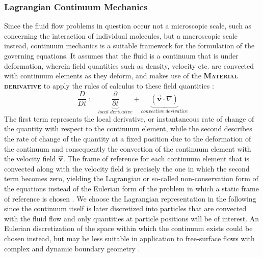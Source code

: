 \documentclass[oneside, a4paper]{book}
\newcommand\emphasis[1]{{\scshape\bfseries#1}}
\newcommand\vek[1]{\vec{\bm{#1}}}
\newcommand\br[1]{\left(#1\right)}
\begin{document}
    \subsubsection{Lagrangian Continuum Mechanics}
    Since the fluid flow problems in question occur not a microscopic scale, such as concerning the interaction of individual molecules, but a macroscopic scale instead, continuum mechanics is a suitable framework for the formulation of the governing equations. It assumes that the fluid is a continuum that is under deformation, wherein field quantities such as density, velocity etc. are convected with continuum elements as they deform, and makes use of the \emphasis{Material derivative} to apply the rules of calculus to these field quantities \autocite{anderson}:
      \begin{equation}
        \frac{D}{Dt} := \underbrace{\frac{\partial}{\partial t}}_{\textit{local derivative}} + \underbrace{\br{\vek{v}\cdot \nabla}}_{\textit{convective derivative}}
      \end{equation}
    The first term represents the local derivative, or instantaneous rate of change of the quantity with respect to the continuum element, while the second describes the rate of change of the quantity at a fixed position due to the deformation of the continuum and consequently the convection of the continuum element with the velocity field $\vek{v}$. The frame of reference for each continuum element that is convected along with the velocity field is precisely the one in which the second term becomes zero, yielding the Lagrangian or so-called non-conservation form of the equations instead of the Eulerian form of the problem in which a static frame of reference is chosen \autocite{anderson}. We choose the Lagrangian representation in the following since the continuum itself is later discretized into particles that are convected with the fluid flow and only quantities at particle positions will be of interest. An Eulerian discretization of the space within which the continuum exists could be chosen instead, but may be less suitable in application to free-surface flows with complex and dynamic boundary geometry \autocite{tutorial2019}.
\end{document}
